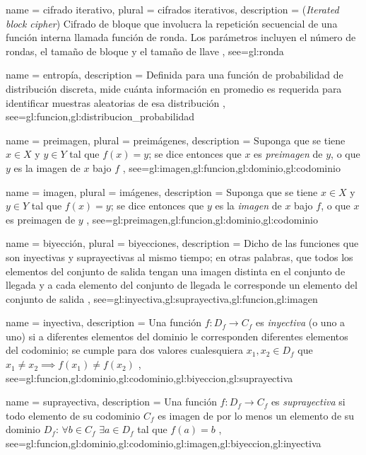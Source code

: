 {
  name = cifrado iterativo,
  plural = cifrados iterativos,
  description = {
    (\textit{Iterated block cipher}) Cifrado de bloque que involucra la
    repetición secuencial de una función interna llamada función de ronda. Los
    parámetros incluyen el número de rondas, el tamaño de bloque y
    el tamaño de llave%
  },
  see={gl:ronda}
}

{
  name = entropía,
  description = {
    Definida para una función de probabilidad de distribución discreta,
    mide cuánta información en promedio es requerida para identificar
    muestras aleatorias de esa distribución%
  },
  see={gl:funcion,gl:distribucion_probabilidad}
}

{
  name = preimagen,
  plural = preimágenes,
  description = {
    Suponga que se tiene $x \in X$ y $y \in Y$ tal que $f(x) = y$;
    se dice entonces que $x$ es \textit{preimagen} de $y$, o que
    $y$ es la imagen de $x$ bajo $f$%
  },
  see={gl:imagen,gl:funcion,gl:dominio,gl:codominio}
}

{
  name = imagen,
  plural = imágenes,
  description = {
    Suponga que se tiene $x \in X$ y $y \in Y$ tal que $f(x) = y$;
    se dice entonces que $y$ es la \textit{imagen} de $x$ bajo $f$,
    o que $x$ es preimagen de $y$%
  },
  see={gl:preimagen,gl:funcion,gl:dominio,gl:codominio}
}

{
  name = biyección,
  plural = biyecciones,
  description = {
    Dicho de las funciones que son inyectivas y
    suprayectivas al mismo tiempo; en otras palabras, que todos los
    elementos del conjunto de salida tengan una imagen distinta en el conjunto
    de llegada y a cada elemento del conjunto de llegada le corresponde
    un elemento del conjunto de salida%
  },
  see={gl:inyectiva,gl:suprayectiva,gl:funcion,gl:imagen}
}

{
  name = inyectiva,
  description = {
    Una función $f:D_f \rightarrow C_f$ es \textit{inyectiva} (o uno a
    uno) si a diferentes elementos del dominio le corresponden
    diferentes elementos del codominio; se cumple para dos
    valores cualesquiera $x_1, x_2 \in D_f$ que
    $x_1 \neq x_2 \implies f(x_1) \neq f(x_2)$%
  },
  see={gl:funcion,gl:dominio,gl:codominio,gl:biyeccion,gl:suprayectiva}
}

{
  name = suprayectiva,
  description = {
    Una función $f:D_f \rightarrow C_f$ es \textit{suprayectiva} si
    todo elemento de su codominio $C_f$ es imagen de
    por lo menos un elemento de su dominio $D_f$: $\forall b \in C_f$
    $\exists a \in D_f$ tal que $f(a)=b$%
  },
  see={gl:funcion,gl:dominio,gl:codominio,gl:imagen,gl:biyeccion,gl:inyectiva}
}

